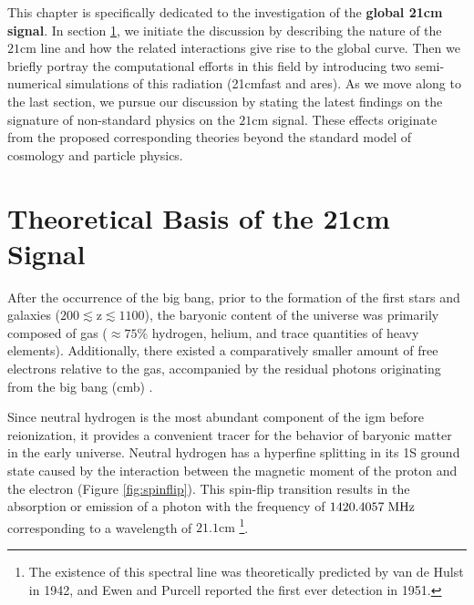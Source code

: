 \documentclass[12pt, TexShade, letterpaper]{report}
\begin{document}
This chapter is specifically dedicated to the investigation of the \textbf{global 21cm signal}. In section \ref{chap:global21cm,sub:physics}, we initiate the discussion by describing the nature of the $\mathrm{21cm}$ line and how the related interactions give rise to the global curve. Then we briefly portray the computational efforts in this field by introducing two semi-numerical simulations of this radiation (\gls{21cmfast} and \gls{ares}).
As we move along to the last section, we pursue our discussion by stating the latest findings on the signature of non-standard physics on the $\mathrm{21cm}$ signal. These effects originate from the proposed corresponding theories beyond the standard model of cosmology and particle physics.\par
\section{Theoretical Basis of the 21cm Signal}
\label{chap:global21cm,sub:physics}
After the occurrence of the big bang, prior to the formation of the first stars and galaxies ($\mathrm{200 \lesssim z \lesssim 1100}$), the baryonic content of the universe was primarily composed of gas ($\approx 75\% $ hydrogen, helium, and trace quantities of heavy elements). Additionally, there existed a comparatively smaller amount of free electrons relative to the gas, accompanied by the residual photons originating from the big bang (\gls{cmb}) \cite{map_universe, 21century}.\par
Since neutral hydrogen is the most abundant component of the \gls{igm} before reionization, it provides a convenient tracer for the behavior of baryonic matter in the early universe. Neutral hydrogen has a hyperfine splitting in its 1S ground state caused by the interaction between the magnetic moment of the proton and the electron (Figure \ref{fig:spinflip}). This spin-flip transition results in the absorption or emission of a photon with the frequency of $\mathrm{1420.4057\hspace{0.1cm} MHz}$\cite{low_frequency} corresponding to a wavelength of $\mathrm{21.1cm}$ \cite{21century} \footnote{The existence of this spectral line was theoretically predicted by van de Hulst in 1942, and Ewen and Purcell reported the first ever detection in 1951\cite{21century}.}.\par
\end{document}

